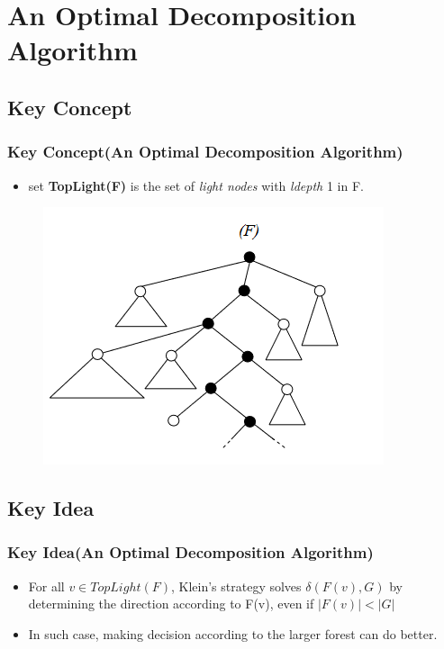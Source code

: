 \documentclass{beamer}
\begin{document}
\section{An Optimal Decomposition Algorithm}
\subsection{Key Concept}
\begin{frame}
\frametitle{Key Concept(An Optimal Decomposition Algorithm)}
\begin{itemize}
\item set \textbf{TopLight(F)} is the set of \emph{light nodes} with \emph{ldepth} 1 in F.
\end{itemize}
\begin{figure}
	\includegraphics[width=0.6\linewidth]{toplight}
	\label{TopLight set} 
	\centering
\end{figure}
\end{frame}


\subsection{Key Idea}
\begin{frame}
\frametitle{Key Idea(An Optimal Decomposition Algorithm)}
\begin{itemize}
\item For all $v \in TopLight(F)$, Klein's strategy solves $\delta(F(v), G)$ by determining the direction according to F(v), even if $\left\vert F(v) \right\vert < \left\vert G \right\vert$
\item In such case, making decision according to the larger forest can do better.
\end{itemize}
\end{frame}

\end{document}
